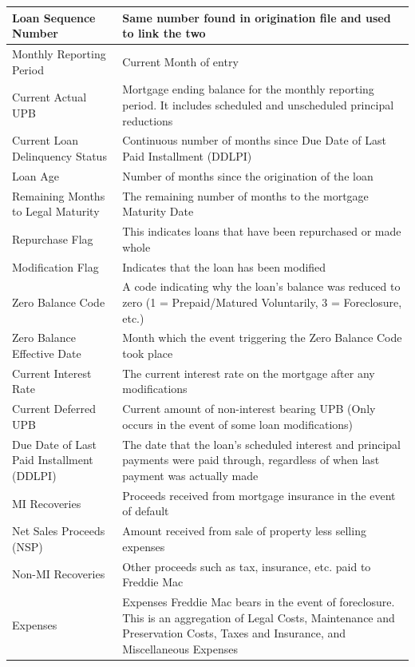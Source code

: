 \documentclass[12 pt]{uncw_thesis}
\theoremstyle{plain}
\theoremstyle{remark}
\theoremstyle{definition}
\begin{document}
\begin{center}
	\begin{longtable}{ |M{6cm}|M{8cm}| } 
		\hline
		Loan Sequence Number &  Same number found in origination file and used to link the two\\
		\hline
		Monthly Reporting Period & Current Month of entry\\ 
		\hline
		Current Actual UPB & Mortgage ending balance for the  monthly reporting period. It includes scheduled and unscheduled principal reductions\\
		\hline
		Current Loan Delinquency Status& Continuous number of months since Due Date of Last Paid Installment (DDLPI)\\
		\hline
		Loan Age & Number of months since the origination of the loan \\ 
		\hline
		Remaining Months to Legal Maturity & The remaining number of months to the mortgage Maturity Date\\
		\hline
		Repurchase Flag & This indicates loans that have been repurchased or made whole\\
		\hline
		Modification Flag & Indicates that the loan has been modified\\
		\hline
		Zero Balance Code & A code indicating why the loan's balance was reduced to zero (1 = Prepaid/Matured Voluntarily, 3 = Foreclosure, etc.)\\
		\hline
		Zero Balance Effective Date & Month which the event triggering the Zero Balance Code took place \\
		\hline
		Current Interest Rate & The current interest rate on the mortgage after any modifications\\
		\hline
		Current Deferred UPB & Current amount of non-interest bearing UPB (Only occurs in the event of some loan modifications)\\
		\hline
		Due Date of Last Paid Installment (DDLPI)&The date that the loan's scheduled interest and principal payments were paid through, regardless of when last payment was actually made\\
		\hline
		MI Recoveries & Proceeds received from mortgage insurance in the event of default\\
		\hline
		Net Sales Proceeds (NSP)& Amount received from sale of property less selling expenses\\
		\hline
		Non-MI Recoveries& Other proceeds such as tax, insurance, etc. paid to Freddie Mac\\
		\hline
		Expenses & Expenses Freddie Mac bears in the event of foreclosure. This is an aggregation of Legal Costs, Maintenance and Preservation Costs, Taxes and Insurance, and Miscellaneous Expenses\\

\end{longtable}
\end{center}
\end{document}
